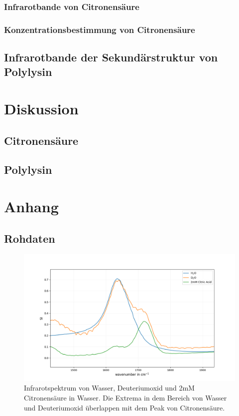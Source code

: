 \documentclass[10pt,a4paper]{article}
\begin{document}
	\subsubsection{Infrarotbande von Citronensäure}
	\subsubsection{Konzentrationsbestimmung von Citronensäure}
	\subsection{Infrarotbande der Sekundärstruktur von Polylysin}
	
	
	
	\section{Diskussion}
	\subsection{Citronensäure}
	\subsection{Polylysin}
	
	\section{Anhang}
	\subsection{Rohdaten}
		\begin{figure}[H]
			\centering
			\includegraphics[scale=0.65]{water_citricacid_upclose.png}
			\caption{Infrarotspektrum von Wasser, Deuteriumoxid und 2mM Citronensäure in Wasser. Die Extrema in dem Bereich von Wasser und Deuteriumoxid überlappen mit dem Peak von Citronensäure.}
			\label{fig:water_citricacid}
		\end{figure}
		
\end{document}
